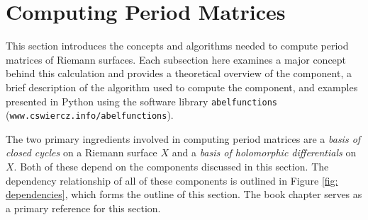 \section{Computing Period Matrices}

This section introduces the concepts and algorithms needed to compute
period matrices of Riemann surfaces. Each subsection here examines a
major concept behind this calculation and provides a theoretical
overview of the component, a brief description of the algorithm used to
compute the component, and examples presented in Python using the
software library {\tt abelfunctions}
(\verb=www.cswiercz.info/abelfunctions=).

The two primary ingredients involved in computing period matrices are a
{\it basis of closed cycles} on a Riemann surface $X$ and a {\it basis
  of holomorphic differentials} on $X$. Both of these depend on the
components discussed in this section. The dependency relationship of all
of these components is outlined in Figure \ref{fig: dependencies}, which
forms the outline of this section. The book chapter
\cite{DeconinckPatterson11} serves as a primary reference for this
section.

